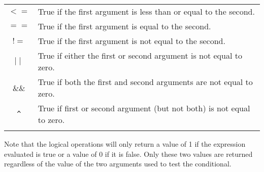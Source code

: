\begin{table}
\begin{tabular}{|c|p{\tabentrylen}|}
    $<=$ & True if the first argument is less than or equal to the second. \\
    $==$ & True if the first argument is equal to the second. \\
    $!=$ & True if the first argument is not equal to the second. \\
    $\mid\mid$
         & True if either the first or second argument is not equal to zero. \\
    \&\& & True if both the first and second arguments are not equal to zero. \\
    \verb+^+
      & True if first or second argument (but not both) is not equal to zero. \\
    & \\ \hline\hline
  \end{tabular}
\end{table}
Note that the logical operations will only return a value
of 1 if the expression evaluated is true or a value of 0 if it is false.
Only these two values are returned
regardless of the value of the two arguments used to test the conditional.

